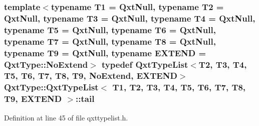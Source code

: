 \hypertarget{struct_qxt_type_1_1_qxt_type_list_a922bd829f1beb1a71f69e5a11f1a255c}{
\subsubsection[{tail}]{\setlength{\rightskip}{0pt plus 5cm}template$<$typename T1  = Qxt\-Null, typename T2  = Qxt\-Null, typename T3  = Qxt\-Null, typename T4  = Qxt\-Null, typename T5  = Qxt\-Null, typename T6  = Qxt\-Null, typename T7  = Qxt\-Null, typename T8  = Qxt\-Null, typename T9  = Qxt\-Null, typename E\-X\-T\-E\-N\-D  = Qxt\-Type\-::\-No\-Extend$>$ typedef {\bf Qxt\-Type\-List}$<$T2, T3, T4, T5, T6, T7, T8, T9, {\bf No\-Extend}, E\-X\-T\-E\-N\-D$>$ {\bf Qxt\-Type\-::\-Qxt\-Type\-List}$<$ T1, T2, T3, T4, T5, T6, T7, T8, T9, E\-X\-T\-E\-N\-D $>$\-::{\bf tail}}}\label{struct_qxt_type_1_1_qxt_type_list_a922bd829f1beb1a71f69e5a11f1a255c}


Definition at line 45 of file qxttypelist.\-h.



